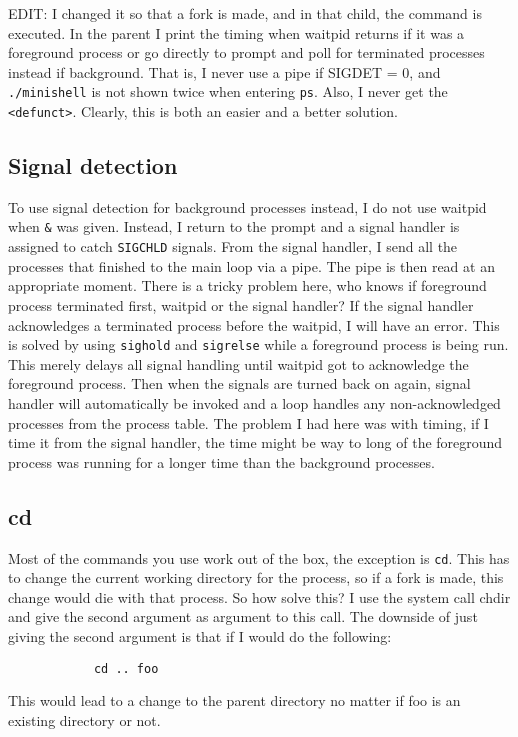 \documentclass{article}
\begin{document}
        EDIT: I changed it so that a fork is made, and in that child, the
        command is executed. In the parent I print the timing when waitpid
        returns if it was a foreground process or go directly to prompt and
        poll for terminated processes instead if background. That is, I never
        use a pipe if SIGDET = 0, and \texttt{./minishell} is not shown twice
        when entering \texttt{ps}. Also, I never get the \texttt{<defunct>}.
        Clearly, this is both an easier and a better solution.

    \subsection{Signal detection}
        To use signal detection for background processes instead, I do not use
        waitpid when \texttt{\&} was given. Instead, I return to the
        prompt and a signal handler is assigned to catch \texttt{SIGCHLD}
        signals. From the signal handler, I send all the processes that
        finished to the main loop via a pipe. The pipe is then read at an
        appropriate moment. There is a tricky problem here, who knows if foreground
        process terminated first, waitpid or the signal handler? If the signal handler
        acknowledges a terminated process before the waitpid, I will have an error.
        This is solved by using \texttt{sighold} and \texttt{sigrelse} while a
        foreground process is being run. This merely delays all signal handling until
        waitpid got to acknowledge the foreground process. Then when the signals
        are turned back on again, signal handler will automatically be invoked
        and a loop handles any non-acknowledged processes from the process table.
        The problem I had here was with timing, if I time it from the signal handler,
        the time might be way to long of the foreground process was running for a
        longer time than the background processes.

    \subsection{cd}
        Most of the commands you use work out of the box, the exception is
        \texttt{cd}. This has to change the current working directory for
        the process, so if a fork is made, this change would die with that
        process. So how solve this? I use the system call chdir and give
        the second argument as argument to this call. The downside of just
        giving the second argument is that if I would do the following:
        \begin{verbatim}
            cd .. foo
        \end{verbatim}
        This would lead to a change to the parent directory no matter if foo is
        an existing directory or not.
\end{document}
